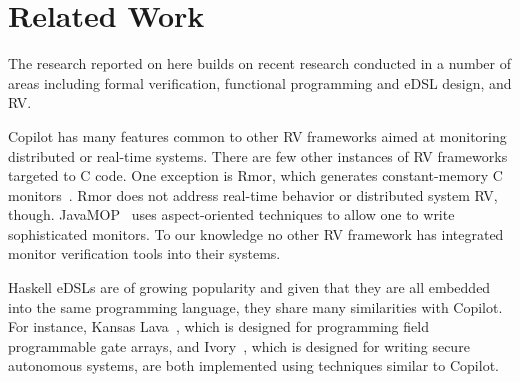 \section{Related Work}\label{sec:related}
The research reported on here builds on recent  research conducted in a number
of areas including formal verification, functional programming and
eDSL design, and RV.  

Copilot has many features common to other RV frameworks aimed at
 monitoring distributed or real-time systems.  
There are few other instances of RV frameworks targeted to C code.  One exception is {\sc
 Rmor}, which generates constant-memory C monitors~\cite{havelundc}.  {\sc
  Rmor} does not address real-time behavior or distributed system RV,
though.    JavaMOP~\cite{javamop}  uses aspect-oriented techniques
to allow one to write sophisticated monitors. To our knowledge no
other RV framework has integrated monitor verification tools into
their systems. 


Haskell eDSLs are of growing popularity and given that they are all
embedded into the same programming language, they share many
similarities with Copilot. For instance, 
 Kansas Lava~\cite{Gill:14:DSLs}, which is designed for
programming  field programmable gate arrays,  and 
Ivory~\cite{pike-plpv14}, which is designed for writing secure autonomous
systems, are both implemented using techniques similar to Copilot.  




